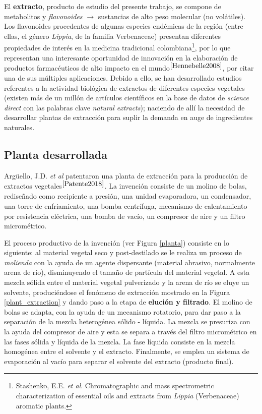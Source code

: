 El \textbf{extracto}, producto de estudio del presente trabajo, se compone de metabolitos y \textit{flavonoides} $\rightarrow$ sustancias de alto peso molecular (no vol\'atiles). Los flavonoides procedentes de algunas especies end\'emicas de la regi\'on (entre ellas, el g\'enero \textit{Lippia}, de la familia Verbenaceae) presentan diferentes propiedades de inter\'es en la medicina tradicional colombiana\footnote{Stashenko, E.E. \textit{et al}. Chromatographic and mass spectrometric characterization of essential oils and extracts from \textit{Lippia} (Verbenaceae) aromatic plants.}, por lo que representan una interesante oportunidad de innovaci\'on en la elaboraci\'on de productos farmac\'euticos de alto impacto en el mundo$^{\cite{Hennebelle2008}}$, por citar una de sus m\'ultiples aplicaciones. Debido a ello, se han desarrollado estudios referentes a la actividad biol\'ogica de extractos de diferentes especies vegetales (existen m\'as de un mill\'on de art\'iculos cient\'ificos en la base de datos de \textit{science direct} con las palabras clave \textit{natural extracts}); naciendo de all\'i la necesidad de desarrollar plantas de extracci\'on para suplir la demanda en auge de ingredientes naturales. 

\subsection{Planta desarrollada}

\noindent
\justify

Arg\"uello, J.D. \textit{et al} patentaron una planta de extracci\'on para la producci\'on de extractos vegetales$^{\cite{Patente2018}}$. La invenci\'on consiste de un molino de bolas, redise\~nado como recipiente a presi\'on, una unidad evaporadora, un condensador, una torre de enfriamiento, una bomba centr\'ifuga, mecanismo de calentamiento por resistencia el\'ectrica, una bomba de vac\'io, un compresor de aire y un filtro microm\'etrico.

\noindent
\justify

El proceso productivo de la invenci\'on (ver Figura \ref{planta}) consiste en lo siguiente: al material vegetal seco y post-destilado se le realiza un proceso de \textit{molienda} con la ayuda de un agente dispersante (material abrasivo, normalmente arena de r\'io), disminuyendo el tama\~no de part\'icula del material vegetal. A esta mezcla s\'olida entre el material vegetal pulverizado y la arena de r\'io se eluye un solvente, produci\'endose el fen\'omeno de extracci\'on mostrado en la Figura \ref{plant_extraction} y dando paso a la etapa de \textbf{eluci\'on y filtrado}. El molino de bolas se adapta, con la ayuda de un mecanismo rotatorio, para dar paso a la separaci\'on de la mezcla heterog\'enea s\'olido - l\'iquida. La mezcla se presuriza con la ayuda del compresor de aire y esta se separa a trav\'es del filtro microm\'etrico en las fases s\'olida y l\'iquida de la mezcla. La fase l\'iquida consiste en la mezcla homog\'enea entre el solvente y el extracto. Finalmente, se emplea un sistema de evaporaci\'on al vac\'io para separar el solvente del extracto (producto final). 


